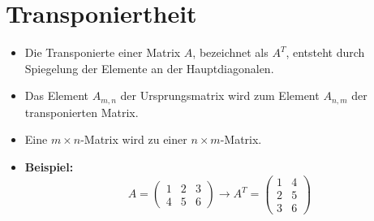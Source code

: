 \section{Transponiertheit}
\begin{itemize}
    \item Die Transponierte einer Matrix \(A\), bezeichnet als \(A^T\), entsteht durch
          Spiegelung der Elemente an der Hauptdiagonalen.
    \item Das Element \(A_{m,n}\) der Ursprungsmatrix wird zum Element \(A_{n,m}\) der
          transponierten Matrix.
    \item Eine \(m \times n\)-Matrix wird zu einer \(n \times m\)-Matrix.
    \item \textbf{Beispiel:}
          \[
              A = \begin{pmatrix}
                  1 & 2 & 3 \\
                  4 & 5 & 6
              \end{pmatrix}
              \rightarrow
              A^T = \begin{pmatrix}
                  1 & 4 \\
                  2 & 5 \\
                  3 & 6
              \end{pmatrix}
          \]
\end{itemize}